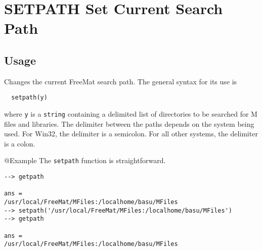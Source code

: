 \section{SETPATH Set Current Search Path}

\subsection{Usage}

Changes the current FreeMat search path.  The general syntax for
its use is
\begin{verbatim}
  setpath(y)
\end{verbatim}
where \verb|y| is a \verb|string| containing a delimited list of directories
to be searched for M files and libraries.  
The delimiter between the paths depends on the system being used.  For Win32, the
delimiter is a semicolon.  For all other systems, the delimiter is a colon.

@Example
The \verb|setpath| function is straightforward.
\begin{verbatim}
--> getpath

ans = 
/usr/local/FreeMat/MFiles:/localhome/basu/MFiles
--> setpath('/usr/local/FreeMat/MFiles:/localhome/basu/MFiles')
--> getpath

ans = 
/usr/local/FreeMat/MFiles:/localhome/basu/MFiles
\end{verbatim}
